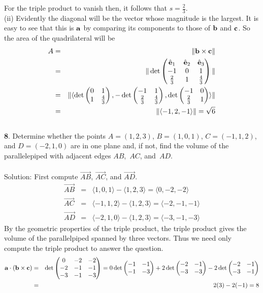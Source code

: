 \documentclass[12pt]{amsbook}
\newcommand{\la}{\langle}
\newcommand{\ra}{\rangle}
\begin{document}
For the triple product to vanish then, it follows that $s=\frac{2}{3}$.
\\
(ii) Evidently the diagonal will be the vector whose magnitude is the largest. It is easy to see that this is $\bf a$ by comparing its components to those of $\bf b$ and $\bf c$. So the area of the quadrilateral will be 
\begin{eqnarray*}
A&=&\|{\bf b}\times{\bf c}\| \\
&=&\|\det\begin{pmatrix}
\hat{\bf e}_1 & \hat{\bf e}_2 & \hat{\bf e}_3\cr -1&0&1\cr \frac{2}{3}&1&\frac{4}{3} \end{pmatrix}\|\\
&=&\|\la \det\begin{pmatrix}0&1\cr 1&\frac{4}{3}  \end{pmatrix}, -\det\begin{pmatrix}-1&1\cr \frac{2}{3}&\frac{4}{3}  \end{pmatrix}, \det\begin{pmatrix}-1&0\cr \frac{2}{3}&1 \end{pmatrix} \ra\| \\
&=&\|\la -1, 2, -1 \ra\| = \sqrt{6} 
\end{eqnarray*}
\\
{\small\bf 8}. Determine whether the points $A=(1,2,3)$, $B=(1,0,1)$,
$C=(-1,1,2)$, and $D=(-2,1,0)$ are in one plane and, if not, find
the volume of the parallelepiped with adjacent edges $AB$,~$AC$,
and~$AD$.\\
\\
{\sc Solution}: First compute $\overrightarrow{AB}$, $\overrightarrow{AC}$, and $\overrightarrow{AD}$. 
\begin{eqnarray*}
\overrightarrow{AB} &=& \la 1,0,1 \ra - \la 1,2,3 \ra = \la 0,-2,-2 \ra \\
\overrightarrow{AC} &=& \la -1,1,2 \ra - \la 1,2,3 \ra = \la -2,-1,-1 \ra \\
\overrightarrow{AD} &=& \la -2,1,0 \ra - \la 1,2,3 \ra = \la -3,-1,-3 \ra
\end{eqnarray*}
By the geometric properties of the triple product, the triple product gives the volume of the parallelpiped spanned by three vectors. Thus we need only compute the triple product to answer the question.
\begin{eqnarray*}
{\bf a}\cdot({\bf b}\times{\bf c})&=&\det
\begin{pmatrix}
0 & -2 & -2\cr -2&-1&-1\cr -3&-1&-3 \end{pmatrix}=0\det\begin{pmatrix}-1&-1\cr -1&-3  \end{pmatrix}+2\det\begin{pmatrix}-2&-1\cr -3&-3 \end{pmatrix}-2\det\begin{pmatrix}-2&-1\cr -3&-1 \end{pmatrix}\\
&=&2(3)-2(-1)=8
\end{eqnarray*}
\end{document}
